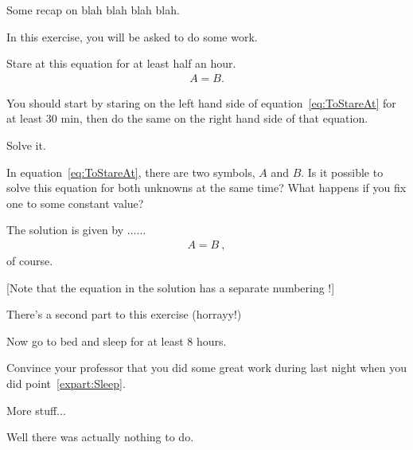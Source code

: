 \documentclass[11pt,a4paper]{article}
\begin{document}
\MakeUebungHeader


\begin{tips}
Some recap on blah blah blah blah.
\end{tips}



In this exercise, you will be asked to do some work.

\begin{exenumerate}
\item Stare at this equation for at least half an hour.
  \begin{align}
    \label{eq:ToStareAt}
    A = B.
  \end{align}

  \begin{tips}
    You should start by staring on the left hand side of equation~\eqref{eq:ToStareAt} for
    at least 30 min, then do the same on the right hand side of that equation.
  \end{tips}
  
\item Solve it.

  \begin{tips}
    In equation~\eqref{eq:ToStareAt}, there are two symbols, $A$ and $B$. Is it possible
    to solve this equation for both unknowns at the same time? What happens if you fix one
    to some constant value?
  \end{tips}

  \begin{loesung}%
    The solution is given by ...... 
    \begin{align}
      A=B\ ,
    \end{align}
    of course.

    [Note that the equation in the solution has a separate numbering !]
  \end{loesung}
\end{exenumerate}

There's a second part to this exercise (horrayy!)

\begin{exenumerate} %
\item \label{expart:Sleep} Now go to bed and sleep for at least 8 hours.
\item Convince your professor that you did some great work during last night when you did
  point~\ref{expart:Sleep}.
\end{exenumerate}



More stuff...

\begin{solution} %
  Well there was actually nothing to do.
\end{solution}
\end{document}
